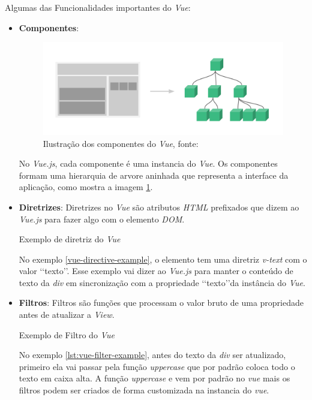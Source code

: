 Algumas das Funcionalidades importantes do \textit{Vue}:

\begin{itemize}
    \item \textbf{Componentes}:
    \begin{figure}[h]
        \centering
        \label{fig:vue-components}
        \includegraphics[keepaspectratio=true,scale=0.25]{figuras/vue-components.png}
        \caption{Ilustração dos componentes do \textit{Vue}, fonte: \cite{vuejs}}
    \end{figure}

    No \textit{Vue.js}, cada componente é uma instancia do \textit{Vue}. Os componentes formam uma hierarquia de arvore aninhada que representa a interface da aplicação, como mostra a imagem \ref{fig:vue-components}.

    \item \textbf{Diretrizes}:
    Diretrizes no \textit{Vue} são atributos \textit{HTML} prefixados que dizem ao \textit{Vue.js} para fazer algo com o elemento \textit{DOM}.
    \begin{listing}[H]
        \caption{Exemplo de diretriz do \textit{Vue}}
        \label{lst:vue-directive-example}
    \end{listing}
    No exemplo \ref{vue-directive-example}, o elemento tem uma diretriz \textit{v-text} com o valor \lq\lq texto\rq\rq. Esse exemplo vai dizer ao \textit{Vue.js} para manter o conteúdo de texto da \textit{div} em sincronização com a propriedade \lq\lq texto\rq\rq da instância do \textit{Vue}.

    \item \textbf{Filtros}:
    Filtros são funções que processam o valor bruto de uma propriedade antes de atualizar a \textit{View}.
        \begin{listing}[H]
            \caption{Exemplo de Filtro do \textit{Vue}}
            \label{lst:vue-filter-example}
        \end{listing}
    No exemplo \ref{lst:vue-filter-example}, antes do texto da \textit{div} ser atualizado, primeiro ela vai passar pela função \textit{uppercase} que por padrão coloca todo o texto em caixa alta. A função \textit{uppercase} e vem por padrão no \textit{vue} mais os filtros podem ser criados de forma customizada na instancia do \textit{vue}.
\end{itemize}
\newpage
